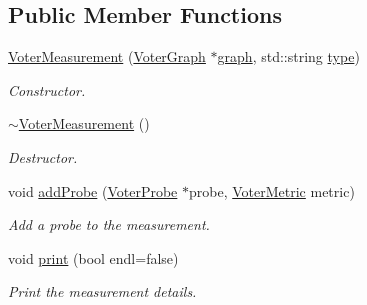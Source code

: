 \subsection*{Public Member Functions}
\begin{DoxyCompactItemize}
\item 
\hyperlink{class_voter_measurement_a0668249876e48af0ae246a554b30195c}{Voter\+Measurement} (\hyperlink{class_voter_graph}{Voter\+Graph} $\ast$\hyperlink{class_voter_measurement_a8d22d4b78f7e2f4c747f5716c4885351}{graph}, std\+::string \hyperlink{class_voter_measurement_ad4471a133827f052622a84c4a451aabe}{type})
\begin{DoxyCompactList}\small\item\em Constructor. \end{DoxyCompactList}\item 
\hypertarget{class_voter_measurement_a2cbd2d015fad1579c21dc62dd2511fe6}{}\hyperlink{class_voter_measurement_a2cbd2d015fad1579c21dc62dd2511fe6}{$\sim$\+Voter\+Measurement} ()\label{class_voter_measurement_a2cbd2d015fad1579c21dc62dd2511fe6}

\begin{DoxyCompactList}\small\item\em Destructor. \end{DoxyCompactList}\item 
void \hyperlink{class_voter_measurement_aa1c64516bc57f2a363ce76c911e26e24}{add\+Probe} (\hyperlink{class_voter_probe}{Voter\+Probe} $\ast$probe, \hyperlink{voter__graph_8hpp_acb4c45a5ce4a55eee28e54e60409b9c5}{Voter\+Metric} metric)
\begin{DoxyCompactList}\small\item\em Add a probe to the measurement. \end{DoxyCompactList}\item 
void \hyperlink{class_voter_measurement_a9164cbbbf69d83a6ca5d8cda0951dcd5}{print} (bool endl=false)
\begin{DoxyCompactList}\small\item\em Print the measurement details. \end{DoxyCompactList}\end{DoxyCompactItemize}
